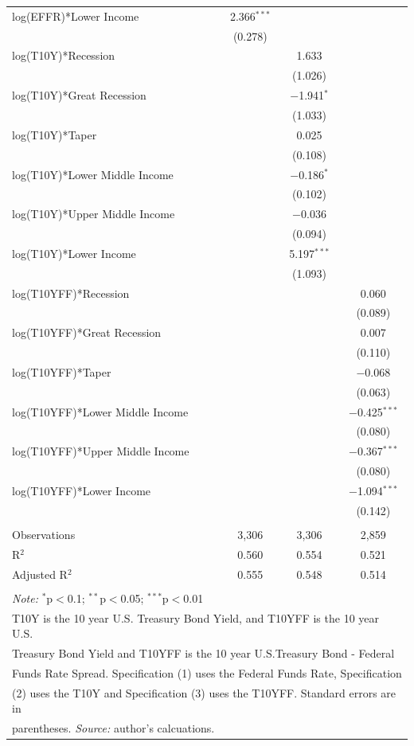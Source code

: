 \documentclass[12pt]{article}
\begin{document}
\begin{table}[!h]
\begin{tabular}{@{\extracolsep{5pt}}lccc}
  log(EFFR)*Lower Income & 2.366$^{***}$ &  &  \\ 
  & (0.278) &  &  \\ 
  log(T10Y)*Recession &  & 1.633 &  \\ 
  &  & (1.026) &  \\ 
  log(T10Y)*Great Recession &  & $-$1.941$^{*}$ &  \\ 
  &  & (1.033) &  \\ 
  log(T10Y)*Taper &  & 0.025 &  \\ 
  &  & (0.108) &  \\ 
  log(T10Y)*Lower Middle Income &  & $-$0.186$^{*}$ &  \\ 
  &  & (0.102) &  \\ 
  log(T10Y)*Upper Middle Income &  & $-$0.036 &  \\ 
  &  & (0.094) &  \\ 
  log(T10Y)*Lower Income &  & 5.197$^{***}$ &  \\ 
  &  & (1.093) &  \\ 
  log(T10YFF)*Recession &  &  & 0.060 \\ 
  &  &  & (0.089) \\ 
  log(T10YFF)*Great Recession &  &  & 0.007 \\ 
  &  &  & (0.110) \\ 
  log(T10YFF)*Taper &  &  & $-$0.068 \\ 
  &  &  & (0.063) \\ 
  log(T10YFF)*Lower Middle Income &  &  & $-$0.425$^{***}$ \\ 
  &  &  & (0.080) \\ 
  log(T10YFF)*Upper Middle Income &  &  & $-$0.367$^{***}$ \\ 
  &  &  & (0.080) \\ 
  log(T10YFF)*Lower Income &  &  & $-$1.094$^{***}$ \\ 
  &  &  & (0.142) \\ 
 \hline \\[-1.8ex] 
Observations & 3,306 & 3,306 & 2,859 \\ 
R$^{2}$ & 0.560 & 0.554 & 0.521 \\ 
Adjusted R$^{2}$ & 0.555 & 0.548 & 0.514 \\ 
\hline 
\hline \\[-1.8ex] 
\multicolumn{4}{l}{\textit{Note:} $^{*}$p$<$0.1; $^{**}$p$<$0.05; $^{***}$p$<$0.01} \\ 
\multicolumn{4}{l}{T10Y is the 10 year U.S. Treasury Bond Yield, and T10YFF is the 10 year U.S.} \\ 
\multicolumn{4}{l}{Treasury Bond Yield and T10YFF is the 10 year U.S.Treasury Bond - Federal} \\ 
\multicolumn{4}{l}{Funds Rate Spread. Specification (1) uses the Federal Funds Rate, Specification} \\
\multicolumn{4}{l}{(2) uses the T10Y and Specification (3) uses the T10YFF. Standard errors are in} \\
\multicolumn{4}{l}{parentheses. \textit{Source:} author's calcuations.} \\
\end{tabular} 
\end{table} 
\FloatBarrier
\end{document}
